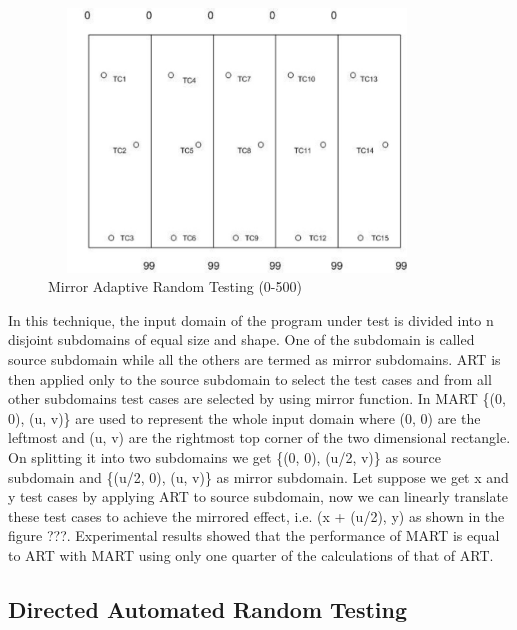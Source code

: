 \begin{figure}[h]
\begin{center}
	\includegraphics[width=10cm, height=7cm ]{Literature/mat}
	\caption{Mirror Adaptive Random Testing (0-500)}
\end{center}  
\end{figure}

In this technique, the input domain of the program under test is divided into n disjoint subdomains of equal size and shape. One of the subdomain is called source subdomain while all the others are termed as mirror subdomains. ART is then applied only to the source subdomain to select the test cases and from all other subdomains test cases are selected by using mirror function. In MART \{(0, 0), (u, v)\} are used to represent the whole input domain where (0, 0) are the leftmost and (u, v) are the rightmost top corner of the two dimensional rectangle. On splitting it into two subdomains we get \{(0, 0), (u/2, v)\} as source subdomain and \{(u/2, 0), (u, v)\} as mirror subdomain. Let suppose we get x and y test cases by applying ART to source subdomain, now we can linearly translate these test cases to achieve the mirrored effect, i.e. (x + (u/2), y) as shown in the figure ???. Experimental results showed that the performance of MART is equal to ART with MART using only one quarter of the calculations of that of ART.    



\subsection{Directed Automated Random Testing}


